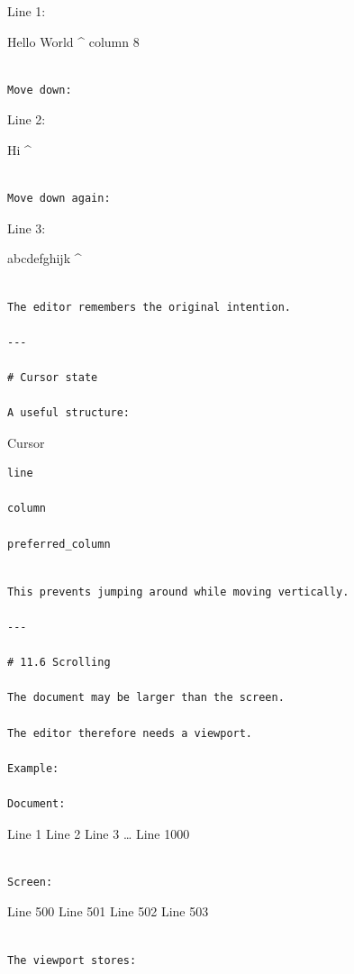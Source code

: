 \documentclass[
  oneside,
  openany]{book}
\begin{document}
Line 1:

Hello World \^{} column 8

\begin{verbatim}

Move down:
\end{verbatim}

Line 2:

Hi \^{}

\begin{verbatim}

Move down again:
\end{verbatim}

Line 3:

abcdefghijk \^{}

\begin{verbatim}

The editor remembers the original intention.

---

# Cursor state

A useful structure:
\end{verbatim}

Cursor

\begin{verbatim}
line

column

preferred_column
\end{verbatim}

\begin{verbatim}

This prevents jumping around while moving vertically.

---

# 11.6 Scrolling

The document may be larger than the screen.

The editor therefore needs a viewport.

Example:

Document:
\end{verbatim}

Line 1 Line 2 Line 3 \ldots{} Line 1000

\begin{verbatim}

Screen:
\end{verbatim}

Line 500 Line 501 Line 502 Line 503

\begin{verbatim}

The viewport stores:
\end{verbatim}
\end{document}
